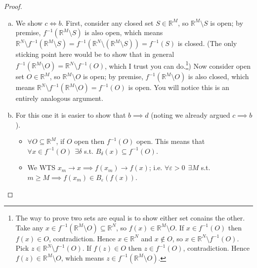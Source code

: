 \documentclass{article}
\begin{document}
\begin{proof}
\begin{enumerate}[a.]
    \item We show $c \iff b$. First, consider any closed set $S \in \mathbb{R}^M$, so $\mathbb{R}^M \setminus S$ is open; by premise, $f^{-1}(\mathbb{R}^M \setminus S)$ is also open, which means $\mathbb{R}^N \setminus f^{-1}(\mathbb{R}^M \setminus S) = f^{-1}(\mathbb{R}^N \setminus (\mathbb{R}^M \setminus S)) = f^{-1}(S)$ is closed. (The only sticking point here would be to show that in general $f^{-1}(\mathbb{R}^M \setminus O) = \mathbb{R}^N \setminus f^{-1}(O)$, which I trust you can do.\footnote{The way to prove two sets are equal is to show either set conains the other. Take any $x \in f^{-1}(\mathbb{R}^M \setminus O) \subseteq \mathbb{R}^N$, so $f(x) \in \mathbb{R}^M \setminus O$. If $x \in f^{-1}(O)$ then $f(x) \in O$, contradiction. Hence $x \in \mathbb{R}^N$ and $x \notin O$, so $x \in \mathbb{R}^N \setminus f^{-1}(O)$.  Pick $z \in \mathbb{R}^N \setminus f^{-1}(O)$. If $f(z) \in O$ then $z \in f^{-1}(O)$, contradiction. Hence $f(z) \in \mathbb{R}^M \setminus O$, which means $z \in f^{-1}(\mathbb{R}^M \setminus O)$.}) Now consider open set $O \in \mathbb{R}^M$, so $\mathbb{R}^M \setminus O$ is open; by premise, $f^{-1}(\mathbb{R}^M \setminus O)$ is also closed, which means $\mathbb{R}^N \setminus f^{-1}(\mathbb{R}^M \setminus O) = f^{-1}(O)$ is open. You will notice this is an entirely analogous argument.


    \item For this one it is easier to show that $b \implies d$ (noting we already argued $c \implies b$).
      \begin{itemize}[label=$\bullet$]
        \item $\forall O \subseteq \mathbb{R}^M$, if $O$ open then $f^{-1}(O)$ open. This means that $\forall x \in f^{-1}(O)~~ \exists\delta$ s.t. $B_{\delta}(x) \subseteq f^{-1}(O)$.

        \item We WTS $x_m \to x \implies f(x_m) \to f(x)$; i.e.  $\forall \varepsilon > 0 ~~ \exists M$ s.t. $m \ge M \implies f(x_m) \in B_{\varepsilon}(f(x))$.

        \begin{figure}[H]
          \centering
\end{figure}
\end{itemize}
\end{enumerate}
\end{proof}
\end{document}
